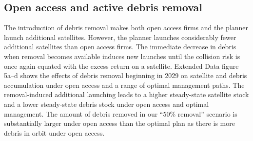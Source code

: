\documentclass[9pt,twoside,lineno]{pnas-new}
\begin{document}

\subsection{Open access and active debris removal}

The introduction of debris removal makes both open access firms and the planner launch additional satellites. However, the planner launches considerably fewer additional satellites than open access firms. The immediate decrease in debris when removal becomes available induces new launches until the collision risk is once again equated with the excess return on a satellite. Extended Data figure 5a--d shows the effects of debris removal beginning in 2029 on satellite and debris accumulation under open access and a range of optimal management paths. The removal-induced additional launching leads to a higher steady-state satellite stock and a lower steady-state debris stock under open access and optimal management. The amount of debris removed in our ``50\% removal'' scenario is substantially larger under open access than the optimal plan as there is more debris in orbit under open access. \\
\end{document}
